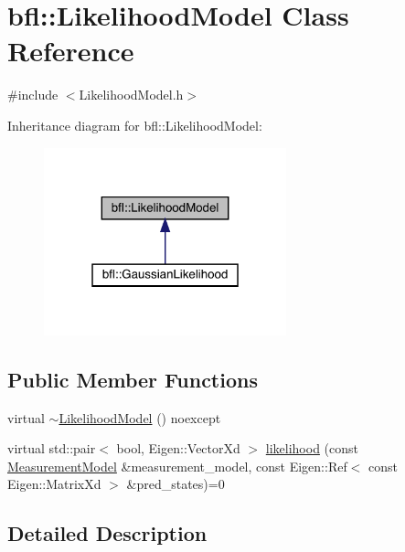 \hypertarget{classbfl_1_1LikelihoodModel}{}\section{bfl\+:\+:Likelihood\+Model Class Reference}
\label{classbfl_1_1LikelihoodModel}


{\ttfamily \#include $<$Likelihood\+Model.\+h$>$}



Inheritance diagram for bfl\+:\+:Likelihood\+Model\+:
\nopagebreak
\begin{figure}[H]
\begin{center}
\leavevmode
\includegraphics[width=199pt]{classbfl_1_1LikelihoodModel__inherit__graph}
\end{center}
\end{figure}
\subsection*{Public Member Functions}
\begin{DoxyCompactItemize}
\item 
virtual \mbox{\hyperlink{classbfl_1_1LikelihoodModel_a48cf7a324006ab2d1162dccfab7fd138}{$\sim$\+Likelihood\+Model}} () noexcept
\item 
virtual std\+::pair$<$ bool, Eigen\+::\+Vector\+Xd $>$ \mbox{\hyperlink{classbfl_1_1LikelihoodModel_a401a363bea9178f568ca4968f9d170b0}{likelihood}} (const \mbox{\hyperlink{classbfl_1_1MeasurementModel}{Measurement\+Model}} \&measurement\+\_\+model, const Eigen\+::\+Ref$<$ const Eigen\+::\+Matrix\+Xd $>$ \&pred\+\_\+states)=0
\end{DoxyCompactItemize}


\subsection{Detailed Description}


